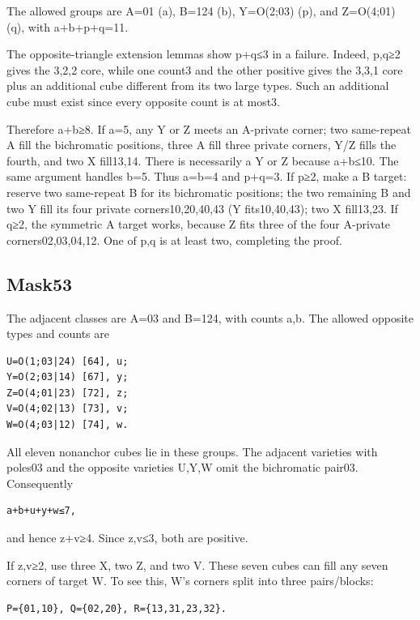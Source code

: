 \documentclass[
  10pt,
]{article}
\begin{document}
The allowed groups are A=01 (a), B=124 (b), Y=O(2;03) (p), and
Z=O(4;01) (q), with a+b+p+q=11.

The opposite-triangle extension lemmas show p+q≤3 in a failure. Indeed,
p,q≥2 gives the 3,2,2 core, while one count3 and the other positive
gives the 3,3,1 core plus an additional cube different from its two
large types. Such an additional cube must exist since every opposite
count is at most3.

Therefore a+b≥8. If a=5, any Y or Z meets an A-private corner; two
same-repeat A fill the bichromatic positions, three A fill three private
corners, Y/Z fills the fourth, and two X fill13,14. There is necessarily
a Y or Z because a+b≤10. The same argument handles b=5. Thus a=b=4 and
p+q=3. If p≥2, make a B target: reserve two same-repeat B for its
bichromatic positions; the two remaining B and two Y fill its four
private corners10,20,40,43 (Y fits10,40,43); two X fill13,23. If q≥2,
the symmetric A target works, because Z fits three of the four A-private
corners02,03,04,12. One of p,q is at least two, completing the proof.

\hypertarget{mask53}{%
\subsection*{Mask53}\label{mask53}}

The adjacent classes are A=03 and B=124, with counts a,b. The allowed
opposite types and counts are

\begin{verbatim}
U=O(1;03|24) [64], u;
Y=O(2;03|14) [67], y;
Z=O(4;01|23) [72], z;
V=O(4;02|13) [73], v;
W=O(4;03|12) [74], w.
\end{verbatim}

All eleven nonanchor cubes lie in these groups. The adjacent varieties
with poles03 and the opposite varieties U,Y,W omit the bichromatic
pair03. Consequently

\begin{verbatim}
a+b+u+y+w≤7,
\end{verbatim}

and hence z+v≥4. Since z,v≤3, both are positive.

If z,v≥2, use three X, two Z, and two V. These seven cubes can fill any
seven corners of target W. To see this, W's corners split into three
pairs/blocks:

\begin{verbatim}
P={01,10}, Q={02,20}, R={13,31,23,32}.
\end{verbatim}
\end{document}
